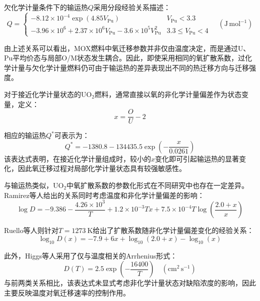 欠化学计量条件下的输运热$Q$采用分段经验关系描述：
\begin{equation}
	Q=
	\begin{cases}
		-8.12\times10^{-4}
		\exp\left(4.85V_{\mathrm{Pu}}\right)
		& V_{\mathrm{Pu}}<3.3 \\[6pt]
		-3.96\times10^{6}
		+
		2.37\times10^{6}V_{\mathrm{Pu}}
		-
		3.6\times10^{5}V_{\mathrm{Pu}}^{2}
		& 3.3\leq V_{\mathrm{Pu}}<4
	\end{cases}
	\quad
	\left(\mathrm{J\,mol^{-1}}\right)
\end{equation}

由上述关系可以看出，MOX燃料中氧迁移参数并非仅由温度决定，而是通过U、Pu平均价态与局部O/M状态发生耦合。因此，即使采用相同的氧扩散系数，过化学计量与欠化学计量燃料仍可由于输运热的差异表现出不同的热迁移方向与迁移强度。

对于接近化学计量状态的UO$_2$燃料，通常直接以氧的非化学计量偏差作为状态变量，定义：
\begin{equation}
	x=\frac{O}{U}-2 
\end{equation}

相应的输运热$Q^{*}$可表示为：
\begin{equation}
	Q^{*}
	=
	-1380.8
	-
	134435.5
	\exp\left(
	-\frac{x}{0.0261}
	\right)
\end{equation}
该表达式表明，在接近化学计量组成时，较小的$x$变化即可引起输运热的显著变化，因此氧迁移过程对局部化学计量状态具有较强敏感性。

与输运热类似，UO$_2$中氧扩散系数的参数化形式在不同研究中也存在一定差异。Ramirez等人\cite{ramirezSimulationsHeatOxygen2006}给出的关系同时考虑温度和非化学计量偏差的影响：
\begin{equation}
	\log D
	=
	-9.386
	-
	\frac{4.26\times10^{3}}{T}
	+
	1.2\times10^{-3}Tx
	+
	7.5\times10^{-4}T
	\log\left(
	\frac{2.0+x}{x}
	\right)
\end{equation}

Ruello等人\cite{ruelloChemicalDiffusionUranium2004}则针对$T=1273~\mathrm{K}$给出了扩散系数随非化学计量偏差变化的经验关系：
\begin{equation}
	\log_{10}D(x)
	=
	-7.9
	+
	6x
	+
	\log_{10}(2.0+x)
	-
	\log_{10}(x)
\end{equation}

此外，Higgs等人\cite{higgsConceptualModelFuel2007}采用了仅与温度相关的Arrhenius形式：
\begin{equation}
	D(T)
	=
	2.5
	\exp\left(
	-\frac{16400}{T}
	\right)
	\quad
	\left(\mathrm{cm^2\,s^{-1}}\right)
\end{equation}
与前两类关系相比，该表达式未显式考虑非化学计量状态对缺陷浓度的影响，因此主要反映温度对氧迁移速率的控制作用。


